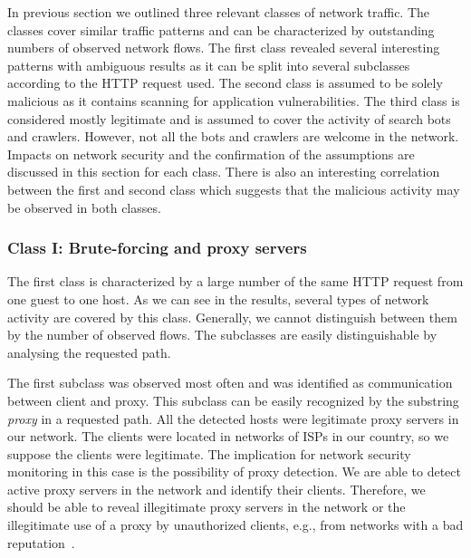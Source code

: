 In previous section we outlined three relevant classes of network traffic. The classes cover similar traffic patterns and can be characterized by outstanding numbers of observed network flows. The first class revealed several interesting patterns with ambiguous results as it can be split into several subclasses according to the HTTP request used. The second class is assumed to be solely malicious as it contains scanning for application vulnerabilities. The third class is considered mostly legitimate and is assumed to cover the activity of search bots and crawlers. However, not all the bots and crawlers are welcome in the network. Impacts on network security and the confirmation of the assumptions are discussed in this section for each class. There is also an interesting correlation between the first and second class which suggests that the malicious activity may be observed in both classes.

\subsubsection{Class I: Brute-forcing and proxy servers}

The first class is characterized by a large number of the same HTTP request from one guest to one host. As we can see in the results, several types of network activity are covered by this class. Generally, we cannot distinguish between them by the number of observed flows. The subclasses are easily distinguishable by analysing the requested path.

The first subclass was observed most often and was identified as communication between client and proxy. This subclass can be easily recognized by the substring \textit{proxy} in a requested path. All the detected hosts were legitimate proxy servers in our network. The clients were located in networks of ISPs in our country, so we suppose the clients were legitimate. The implication for network security monitoring in this case is the possibility of proxy detection. We are able to detect active proxy servers in the network and identify their clients. Therefore, we should be able to reveal illegitimate proxy servers in the network or the illegitimate use of a proxy by unauthorized clients, e.g., from networks with a bad reputation~\cite{MoreiraMoura-2013-Internet}.

